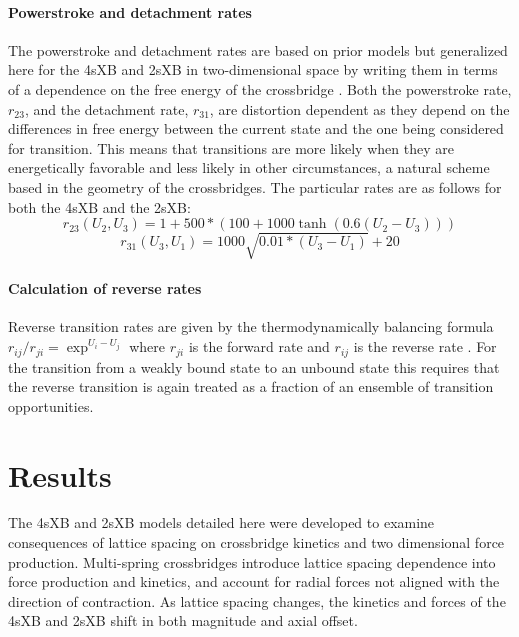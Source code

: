 \documentclass[]{article}
\begin{document}
\paragraph{Powerstroke and detachment rates} %
The powerstroke and detachment rates are based on prior models but  generalized here for the 4sXB and 2sXB in two-dimensional space by writing them in terms of a dependence on the free energy of the crossbridge  \citep{Pate1989, Tanner2007}. 
Both the powerstroke rate, $r_{23}$, and the detachment rate, $r_{31}$, are distortion dependent as they depend on the differences in free energy between the current state and the one being considered for transition. 
This means that transitions are more likely when they are energetically favorable and less likely in other circumstances, a natural scheme based in the geometry of the crossbridges.
The particular rates are as follows for both the 4sXB and the 2sXB:
$$r_{23}(U_2, U_3) = 1 + 500 * (100 + 1000 \tanh(0.6 (U_2 - U_3))) $$
$$r_{31}(U_3, U_1) = 1000\sqrt{0.01 *  (U_3 - U_1)} + 20$$

\paragraph{Calculation of reverse rates} %
Reverse transition rates are given by the thermodynamically balancing formula $r_{ij}/r_{ji}=\exp^{U_i-U_j}$ where $r_{ji}$ is the forward rate and $r_{ij}$ is the reverse rate \citep{Pate1989, Daniel1998, Tanner2007}.
For the transition from a weakly bound state to an unbound state this requires that the reverse transition is again treated as a fraction of an ensemble of transition opportunities.



\section{Results} %

The 4sXB and 2sXB models detailed here were developed to examine consequences of lattice spacing on crossbridge kinetics and two dimensional force production.
Multi-spring crossbridges introduce lattice spacing dependence into force production and kinetics, and account for radial forces not aligned with the direction of contraction. 
As lattice spacing changes, the kinetics and forces of the 4sXB and 2sXB shift in both magnitude and axial offset.
\end{document}

